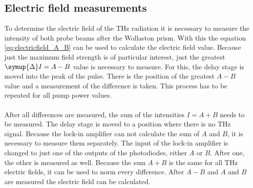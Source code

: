 \subsection{Electric field measurements}
\label{sec:field}
To determine the electric field of the $\si{\tera\hertz}$ radiation it is necessary to measure the intensity of both probe beams after the Wollaston prism.
With this the equation \eqref{eq:electricfield_A_B} can be used to calculate the electric field value.
Because just the maximum field strength is of particular interest, just the greatest $\symup{\Delta}I = A-B$ value is necessary to measure.
For this, the delay stage is moved into the peak of the pulse.
There is the position of the greatest $A-B$ value and a measurement of the difference is taken.
This process has to be repeated for all pump power values.
\\\\
After all differences are measured, the sum of the intensities $I = A + B$ needs to be measured.
The delay stage is moved to a position where there is no $\si{\tera\hertz}$ signal.
Because the lock-in amplifier can not calculate the sum of $A$ and $B$, it is necessary to measure them separately.
The input of the lock-in amplifier is changed to just one of the outputs of the photodiodes, either $A$ or $B$.
After one, the other is measured as well.
Because the sum $A+B$ is the same for all $\si{\tera\hertz}$ electric fields, it can be used to norm every difference.
After $A-B$ and $A$ and $B$ are measured the electric field can be calculated.
